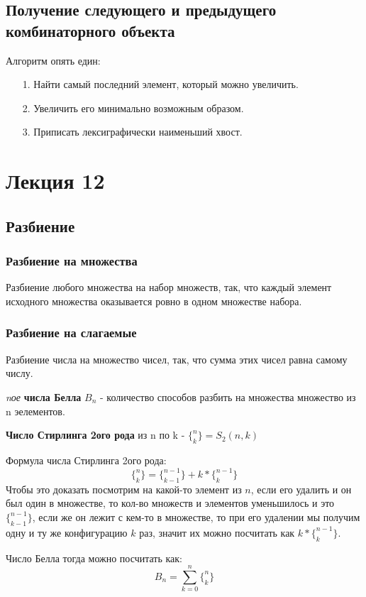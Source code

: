 \documentclass{article}
\begin{document}
\subsection{Получение следующего и предыдущего комбинаторного объекта}
Алгоритм опять един:
\begin{enumerate}
    \item[1.] Найти самый последний элемент, который можно увеличить.
    \item[2.] Увеличить его минимально возможным образом.
    \item[3.] Приписать лексиграфически наименьший хвост.
    
\end{enumerate}

\section{Лекция 12}
\subsection{Разбиение}
\subsubsection{Разбиение на множества}
Разбиение любого множества на набор множеств, так, что каждый элемент исходного множества оказывается ровно в одном множестве набора. 

\subsubsection{Разбиение на слагаемые}
Разбиение числа на множество чисел, так, что сумма этих чисел равна самому числу.

\textit{nое} \textbf{числа Белла} $B_n$ - количество способов разбить на множества множество из n эелементов. 

\textbf{Число Стирлинга 2ого рода} из n по k - $\{_k^n\}=S_2(n, k)$

Формула числа Стирлинга 2ого рода: $$\{_k^n\} = \{_{k - 1}^{n - 1}\}+k*\{_k^{n-1}\}$$
Чтобы это доказать посмотрим на какой-то элемент из $n$, если его удалить и он был один в множестве, то кол-во множеств и элементов уменьшилось и это $\{_{k - 1}^{n - 1}\}$, если же он лежит с кем-то в множестве, то при его удалении мы получим одну и ту же конфигурацию $k$ раз, значит их можно посчитать как $k*\{_k^{n-1}\}$.

Число Белла тогда можно посчитать как: $$B_n = \sum\limits_{k=0}^n\{_k^n\}$$
\end{document}
